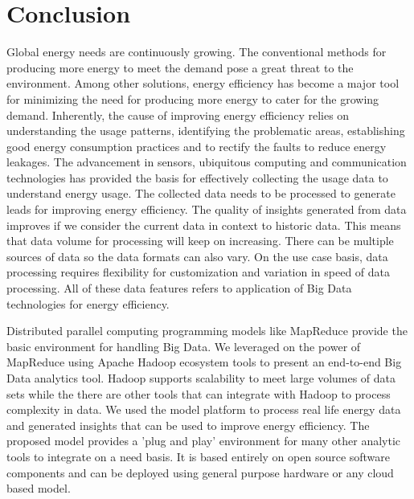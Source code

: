 \chapter{Conclusion}
\label{chapter:concluion}

Global energy needs are continuously growing. The conventional methods for producing more energy to meet the demand pose a great threat to the environment. Among other solutions, energy efficiency has become a major tool for minimizing the need for producing more energy to cater for the growing demand. Inherently, the cause of improving energy efficiency relies on understanding the usage patterns, identifying the problematic areas, establishing good energy consumption practices and to rectify the faults to reduce energy leakages. The advancement in sensors, ubiquitous computing  and communication technologies has provided the basis for effectively collecting the usage data to understand energy usage. The collected data needs to be processed to generate leads for improving energy efficiency. The quality of insights generated from data improves if we consider the current data in context to historic data. This means that data volume for processing will keep on increasing. There can be multiple sources of data so the data formats can also vary. On the use case basis, data processing requires flexibility for customization and variation in speed of data processing. All of these data features refers to application of Big Data technologies for energy efficiency. 

Distributed parallel computing programming models like MapReduce provide the basic environment for handling Big Data. We leveraged on the power of MapReduce using Apache Hadoop ecosystem tools to present an end-to-end Big Data analytics tool. Hadoop supports scalability to meet large volumes of data sets while the there are other tools that can integrate with Hadoop to process complexity in data. We used the model platform to process real life energy data and generated insights that can be used to improve energy efficiency. The proposed model provides a 'plug and play' environment for many other analytic tools to integrate on a need basis. It is based entirely on open source software components and can be deployed using general purpose hardware or any cloud based model.


